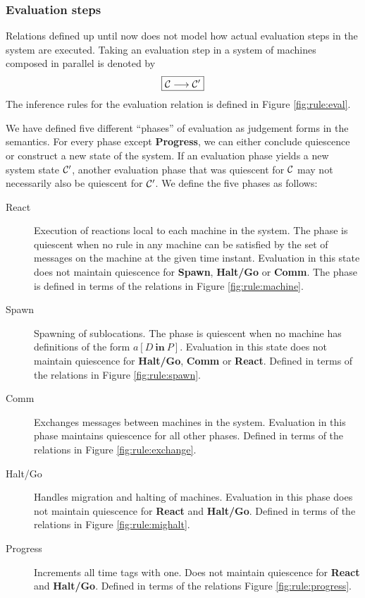 \subsubsection{Evaluation steps}

Relations defined up until now does not model how actual evaluation steps in the
system are executed. Taking an evaluation step in a system of machines composed
in parallel is denoted by
\begin{equation*}
\boxed{\mathcal{C} \longrightarrow \mathcal{C}'}
\end{equation*}
The inference rules for the evaluation relation is defined in Figure
\ref{fig:rule:eval}.

We have defined five different ``phases'' of evaluation as judgement forms in
the semantics. For every phase except \textbf{Progress}, we can either conclude
quiescence or construct a new state of the system. If an evaluation phase yields
a new system state $\mathcal{C}'$, another evaluation phase that was quiescent for $\mathcal{C}$
may not necessarily also be quiescent for $\mathcal{C}'$. We define the five phases as
follows:

\begin{description}
 \item[React] Execution of reactions local to each machine in the system. The
 phase is quiescent when no rule in any machine can be satisfied by the set of
 messages on the machine at the given time instant. Evaluation in this state
 does not maintain quiescence for \textbf{Spawn}, \textbf{Halt/Go} or
 \textbf{Comm}. The phase is defined in terms of the relations in Figure
 \ref{fig:rule:machine}.

 \item[Spawn] Spawning of sublocations. The phase is quiescent when no machine
 has definitions of the form $a[D~\mathbf{in}~P]$. Evaluation in this state does
 not maintain quiescence for \textbf{Halt/Go}, \textbf{Comm} or \textbf{React}.
 Defined in terms of the relations in Figure \ref{fig:rule:spawn}.

 \item[Comm] Exchanges messages between machines in the system. Evaluation in
 this phase maintains quiescence for all other phases. Defined in terms of the
 relations in Figure \ref{fig:rule:exchange}.

 \item[Halt/Go] Handles migration and halting of machines. Evaluation in this
 phase does not maintain quiescence for \textbf{React} and \textbf{Halt/Go}.
 Defined in terms of the relations in Figure \ref{fig:rule:mighalt}.

 \item[Progress] Increments all time tags with one. Does not maintain quiescence
 for \textbf{React} and \textbf{Halt/Go}. Defined in terms of the relations
 Figure \ref{fig:rule:progress}.
\end{description}


